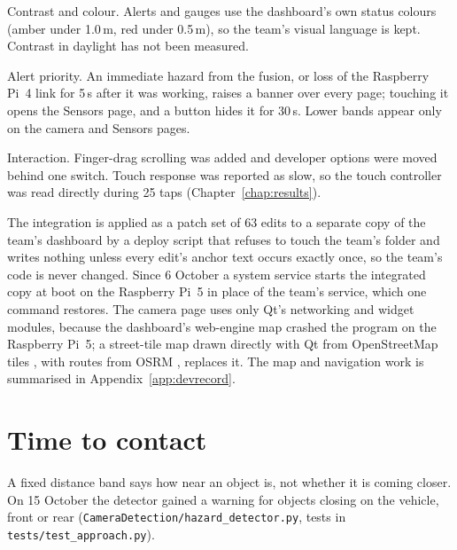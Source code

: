 Contrast and colour. Alerts and gauges use the dashboard's own status colours (amber under 1.0\,m, red under 0.5\,m), so the team's visual language is kept. Contrast in daylight has not been measured.

Alert priority. An immediate hazard from the fusion, or loss of the Raspberry Pi~4 link for 5\,s after it was working, raises a banner over every page; touching it opens the Sensors page, and a button hides it for 30\,s. Lower bands appear only on the camera and Sensors pages.

Interaction. Finger-drag scrolling was added and developer options were moved behind one switch. Touch response was reported as slow, so the touch controller was read directly during 25 taps (Chapter~\ref{chap:results}).

The integration is applied as a patch set of 63 edits to a separate copy of the team's dashboard by a deploy script that refuses to touch the team's folder and writes nothing unless every edit's anchor text occurs exactly once, so the team's code is never changed. Since 6 October a system service starts the integrated copy at boot on the Raspberry Pi~5 in place of the team's service, which one command restores. The camera page uses only Qt's networking and widget modules, because the dashboard's web-engine map crashed the program on the Raspberry Pi~5; a street-tile map drawn directly with Qt from OpenStreetMap tiles \cite{osm}, with routes from OSRM \cite{luxen2011osrm}, replaces it. The map and navigation work is summarised in Appendix~\ref{app:devrecord}.

\section{Time to contact}
\label{sec:impl-ttc}

A fixed distance band says how near an object is, not whether it is coming closer. On 15 October the detector gained a warning for objects closing on the vehicle, front or rear (\texttt{CameraDetection/\allowbreak{}hazard\_\allowbreak{}detector.py}, tests in \texttt{tests/test\_approach.py}).

